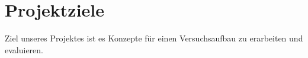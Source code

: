 \section{Projektziele}
Ziel unseres Projektes ist es Konzepte f\"{u}r einen Versuchsaufbau zu erarbeiten und evaluieren.